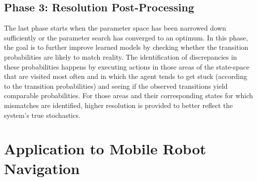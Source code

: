
\newpage

\subsection{Phase 3: Resolution Post-Processing}
\label{sec:phase-3}

The last phase starts when the parameter space has been narrowed down sufficiently or the parameter search has converged to an optimum.
In this phase, the goal is to further improve learned models by checking whether the transition probabilities are likely to match reality.
The identification of discrepancies in these probabilities happens by executing actions in those areas of the state-space that are visited most often and in which the agent tends to get stuck (according to the transition probabilities) and seeing if the observed transitions yield comparable probabilities.
For those areas and their corresponding states for which mismatches are identified, higher resolution is provided to better reflect the system's true stochastics.



\section{Application to Mobile Robot Navigation}
\label{sec:application-mobile-robot}

